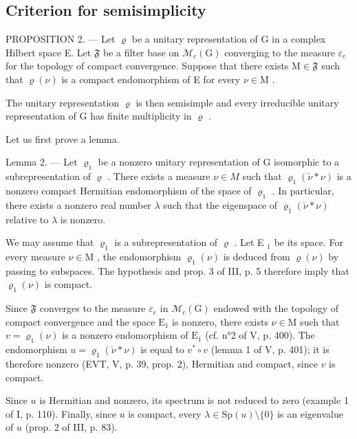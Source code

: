 \subsection{Criterion for semisimplicity}

PROPOSITION 2. --- Let \(\varrho\) be a unitary representation of G in a complex Hilbert space E. Let \(\mathfrak{F}\) be a filter base on \(\mathcal{M}_{c}(\mathrm{G})\) converging to the measure \(\varepsilon_{e}\) for the topology of compact convergence. Suppose that there exists \(\mathrm{M} \in \mathfrak{F}\) such that \(\varrho(\nu)\) is a compact endomorphism of E for every \(\nu \in \mathrm{M}\) .

The unitary representation \(\varrho\) is then semisimple and every irreducible unitary representation of G has finite multiplicity in \(\varrho\) .

Let us first prove a lemma.

Lemma 2. --- Let \(\varrho_{1}\) be a nonzero unitary representation of G isomorphic to a subrepresentation of \(\varrho\) . There exists a measure \(\nu \in M\) such that \(\varrho_{1}(\check{\nu} * \nu)\) is a nonzero compact Hermitian endomorphism of the space of \(\varrho_{1}\) . In particular, there exists a nonzero real number \(\lambda\) such that the eigenspace of \(\varrho_{1}(\check{\nu} * \nu)\) relative to \(\lambda\) is nonzero.

We may assume that \(\varrho_{1}\) is a subrepresentation of \(\varrho\) . Let E \(_{1}\) be its space. For every measure \(\nu \in \mathrm{M}\) , the endomorphism \(\varrho_{1}(\nu)\) is deduced from \(\varrho(\nu)\) by passing to subspaces. The hypothesis and prop. 3 of III, p. 5 therefore imply that \(\varrho_{1}(\nu)\) is compact.

Since \(\mathfrak{F}\) converges to the measure \(\varepsilon_{e}\) in \(\mathcal{M}_{c}(\mathrm{G})\) endowed with the topology of compact convergence and the space \(\mathrm{E}_{1}\) is nonzero, there exists \(\nu\in\mathrm{M}\) such that \(v=\varrho_{1}(\nu)\) is a nonzero endomorphism of \(\mathrm{E}_{1}\) (cf. n°2 of V, p. 400). The endomorphism \(u=\varrho_{1}(\check{\nu}*\nu)\) is equal to \(v^{*}\circ v\) (lemma 1 of V, p. 401); it is therefore nonzero (EVT, V, p. 39, prop. 2), Hermitian and compact, since \(v\) is compact.

Since \(u\) is Hermitian and nonzero, its spectrum is not reduced to zero (example 1 of I, p. 110). Finally, since \(u\) is compact, every \(\lambda \in \mathrm{Sp}(u)\setminus\{0\}\) is an eigenvalue of \(u\) (prop. 2 of III, p. 83).


